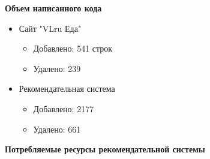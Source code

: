 \textbf{Объем написанного кода}

\begin{itemize}
  \item Сайт "VLru Еда"
    \begin{itemize}
      \item Добавлено: 541 строк
      \item Удалено: 239
    \end{itemize}
  \item Рекомендательная система
    \begin{itemize}
      \item Добавлено: 2177
      \item Удалено: 661
    \end{itemize}
\end{itemize}

\textbf{Потребляемые ресурсы рекомендательной системы}


